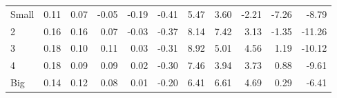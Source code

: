 \begin{table}[!ht]
\begin{tabular}{lrrrrrrrrrr}
    \\
      \cmidrule(r){2-6} \cmidrule(r){7-11}

    Small   & 0.11  & 0.07  & -0.05  & -0.19  & -0.41  & 5.47  & 3.60  & -2.21  & -7.26  & -8.79  \\
         2  & 0.16  & 0.16  & 0.07  & -0.03  & -0.37  & 8.14  & 7.42  & 3.13  & -1.35  & -11.26  \\
         3  & 0.18  & 0.10  & 0.11  & 0.03  & -0.31  & 8.92  & 5.01  & 4.56  & 1.19  & -10.12  \\
         4  & 0.18  & 0.09  & 0.09  & 0.02  & -0.30  & 7.46  & 3.94  & 3.73  & 0.88  & -9.61  \\
    Big     & 0.14  & 0.12  & 0.08  & 0.01  & -0.20  & 6.41  & 6.61  & 4.69  & 0.29  & -6.41  \\

  

  \bottomrule
\end{tabular}
\label{tbl:25_Size_Var_C1997b}
\end{table}